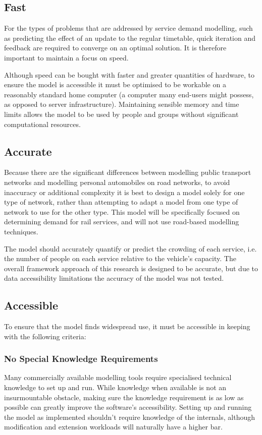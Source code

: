 \subsection{Fast}
For the types of problems that are addressed by service demand modelling, such as predicting the effect of an update to the regular timetable, quick iteration and feedback are required to converge on an optimal solution. It is therefore important to maintain a focus on speed.

Although speed can be bought with faster and greater quantities of hardware, to ensure the model is accessible it must be optimised to be workable on a reasonably standard home computer (a computer many end-users might possess, as opposed to server infrastructure). Maintaining sensible memory and time limits allows the model to be used by people and groups without significant computational resources.

\subsection{Accurate}
Because there are the significant differences between modelling public transport networks and modelling personal automobiles on road networks, to avoid inaccuracy or additional complexity it is best to design a model solely for one type of network, rather than attempting to adapt a model from one type of network to use for the other type. This model will be specifically focused on determining demand for rail services, and will not use road-based modelling techniques.

The model should accurately quantify or predict the crowding of each service, i.e. the number of people on each service relative to the vehicle's capacity. The overall framework approach of this research is designed to be accurate, but due to data accessibility limitations the accuracy of the model was not tested.

\subsection{Accessible}
To ensure that the model finds widespread use, it must be accessible in keeping with the following criteria:
\subsubsection{No Special Knowledge Requirements}
Many commercially available modelling tools require specialised technical knowledge to set up and run. While knowledge when available is not an insurmountable obstacle, making sure the knowledge requirement is as low as possible can greatly improve the software's accessibility. Setting up and running the model as implemented shouldn't require knowledge of the internals, although modification and extension workloads will naturally have a higher bar.
